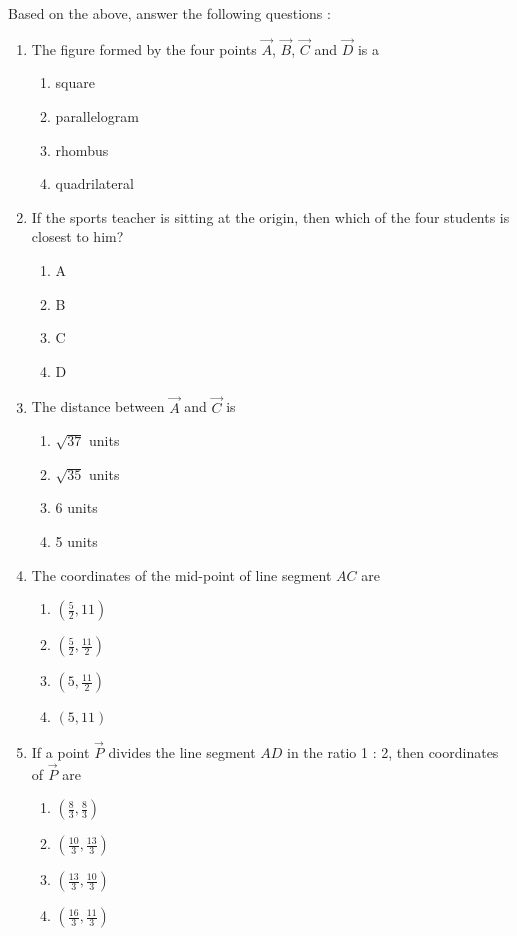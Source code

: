 \documentclass{article}
\begin{document}
\begin{enumerate}
Based on the above, answer the following questions : 	
\begin{enumerate}
\item  The figure formed by the four points $\vec{A}$, $\vec{B}$, $\vec{C}$ and $\vec{D}$ is a 
	\begin{enumerate}
	\item  square 
	\item  parallelogram
	\item  rhombus 
	\item  quadrilateral 
	\end{enumerate}
\item If the sports teacher is sitting at the origin, then which of the four students is closest to him? 
	\begin{enumerate}
	\item  A
	\item  B
	\item  C
	\item  D
	\end{enumerate}
\item The distance between $\vec{A}$ and $\vec{C}$ is
	\begin{enumerate}
	\item $\sqrt{37}$ units
	\item $\sqrt{35}$ units
	\item 6 units
	\item 5 units
	\end{enumerate}
\item The coordinates of the mid-point of line segment $AC$ are
	\begin{enumerate}
	\item $(\frac{5}{2},11)$
	\item $(\frac{5}{2},\frac{11}{2})$
	\item $(5,\frac{11}{2})$
	\item $(5,11)$
	\end{enumerate}
\item If a point $\vec{P}$ divides the line segment $AD$ in the ratio 1 : 2, then coordinates of $\vec{P}$ are
	\begin{enumerate}
	\item $(\frac{8}{3},\frac{8}{3})$
	\item $(\frac{10}{3},\frac{13}{3})$
	\item $(\frac{13}{3},\frac{10}{3})$
	\item $(\frac{16}{3},\frac{11}{3})$
	\end{enumerate}
\end{enumerate}
		

\end{enumerate}
\end{document}
